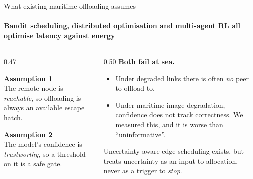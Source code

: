 \documentclass[aspectratio=169, 11pt]{beamer}
\newcommand{\callout}[2][wash]{%
  \begin{beamercolorbox}[wd=\textwidth, sep=0.55em]{}%
  \colorbox{#1}{\parbox{\dimexpr\textwidth-1.2em\relax}{\vspace{0.15em}#2\vspace{0.15em}}}%
  \end{beamercolorbox}}
\begin{document}
\begin{frame}{What existing maritime offloading assumes}
\framesubtitle{Bandit scheduling, distributed optimisation and multi-agent RL all optimise latency against energy}

\vspace{0.6em}
\begin{columns}[T]
\begin{column}{0.47\textwidth}
  \callout[wash]{\textbf{\color{navy}Assumption 1}\\[0.4em]
  The remote node is \emph{reachable}, so offloading is always an available escape hatch.}
  \vspace{0.9em}
  \callout[wash]{\textbf{\color{navy}Assumption 2}\\[0.4em]
  The model's confidence is \emph{trustworthy}, so a threshold on it is a safe gate.}
\end{column}
\begin{column}{0.50\textwidth}
  \textbf{\color{corange}Both fail at sea.}
  \begin{itemize}\setlength\itemsep{0.5em}
    \item Under degraded links there is often \emph{no} peer to offload to.
    \item Under maritime image degradation, confidence does not track correctness. We measured this, and it is worse than ``uninformative''.
  \end{itemize}
  \vspace{0.6em}
  {\color{ink2}\small Uncertainty-aware edge scheduling exists, but treats uncertainty as an input to allocation, never as a trigger to \emph{stop}.}
\end{column}
\end{columns}
\end{frame}
\end{document}
